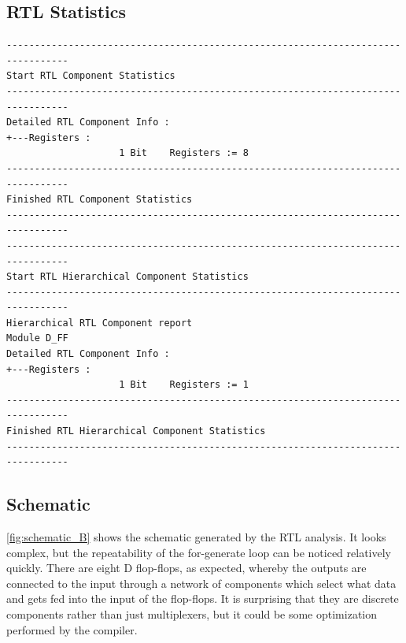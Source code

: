 \documentclass[10pt]{article}
\begin{document}
\subsection{RTL Statistics}
\begin{verbatim}
---------------------------------------------------------------------------------
Start RTL Component Statistics 
---------------------------------------------------------------------------------
Detailed RTL Component Info : 
+---Registers : 
	                1 Bit    Registers := 8     
---------------------------------------------------------------------------------
Finished RTL Component Statistics 
---------------------------------------------------------------------------------
---------------------------------------------------------------------------------
Start RTL Hierarchical Component Statistics 
---------------------------------------------------------------------------------
Hierarchical RTL Component report 
Module D_FF 
Detailed RTL Component Info : 
+---Registers : 
	                1 Bit    Registers := 1     
---------------------------------------------------------------------------------
Finished RTL Hierarchical Component Statistics
---------------------------------------------------------------------------------
\end{verbatim}
\newpage
\subsection{Schematic}
\autoref{fig:schematic_B} shows the schematic generated by the RTL analysis. It looks complex, but the repeatability of the for-generate loop can be noticed relatively quickly. There are eight D flop-flops, as expected, whereby the outputs are connected to the input through a network of components which select what data and gets fed into the input of the flop-flops.
It is surprising that they are discrete components rather than just multiplexers, but it could be some optimization performed by the compiler.
\newpage
\end{document}
